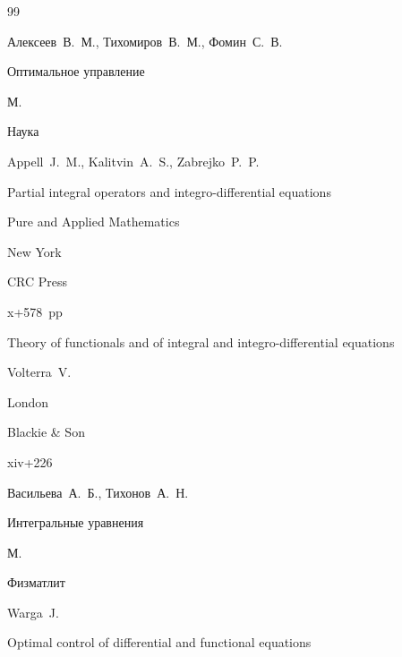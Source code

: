 \begin{thebibliography}{99}




\by Алексеев~В.~М., Тихомиров~В.~М., Фомин~С.~В.

\book Оптимальное управление

\publaddr М.

\publ  Наука






\by Appell~J.~M., Kalitvin~A.~S., Zabrejko~P.~P.

\book Partial integral operators and integro-differential equations

\serial Pure and Applied Mathematics

\publaddr New York

\publ CRC Press


\totalpages x+578~pp \nofrills





\book Theory of functionals and of integral and integro-differential equations

\by Volterra~V.

\publaddr London  

\publ Blackie  \& Son


\totalpages xiv+226







\by Васильева~А.~Б., Тихонов~А.~Н.

\book Интегральные уравнения

\publaddr М.

\publ Физматлит






\by Warga~J.

\book Optimal control of differential and functional equations


\end{thebibliography}
